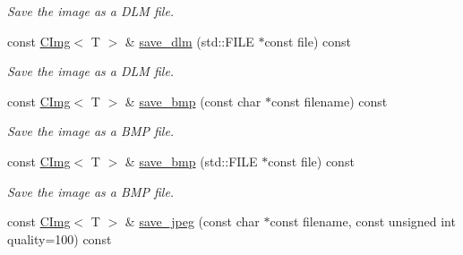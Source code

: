 \begin{DoxyCompactItemize}
\begin{DoxyCompactList}\small\item\em Save the image as a DLM file. \item\end{DoxyCompactList}\item 
\hypertarget{structcimg__library_1_1CImg_ad885e6c12443f07db548367d83668f62}{
const \hyperlink{structcimg__library_1_1CImg}{CImg}$<$ T $>$ \& \hyperlink{structcimg__library_1_1CImg_ad885e6c12443f07db548367d83668f62}{save\_\-dlm} (std::FILE $\ast$const file) const }
\label{structcimg__library_1_1CImg_ad885e6c12443f07db548367d83668f62}

\begin{DoxyCompactList}\small\item\em Save the image as a DLM file. \item\end{DoxyCompactList}\item 
\hypertarget{structcimg__library_1_1CImg_a2f8e01d96cddfa3c0d0d2dc9d86745ac}{
const \hyperlink{structcimg__library_1_1CImg}{CImg}$<$ T $>$ \& \hyperlink{structcimg__library_1_1CImg_a2f8e01d96cddfa3c0d0d2dc9d86745ac}{save\_\-bmp} (const char $\ast$const filename) const }
\label{structcimg__library_1_1CImg_a2f8e01d96cddfa3c0d0d2dc9d86745ac}

\begin{DoxyCompactList}\small\item\em Save the image as a BMP file. \item\end{DoxyCompactList}\item 
\hypertarget{structcimg__library_1_1CImg_acb4b655a3aca162d8db9257f989f765e}{
const \hyperlink{structcimg__library_1_1CImg}{CImg}$<$ T $>$ \& \hyperlink{structcimg__library_1_1CImg_acb4b655a3aca162d8db9257f989f765e}{save\_\-bmp} (std::FILE $\ast$const file) const }
\label{structcimg__library_1_1CImg_acb4b655a3aca162d8db9257f989f765e}

\begin{DoxyCompactList}\small\item\em Save the image as a BMP file. \item\end{DoxyCompactList}\item 
\hypertarget{structcimg__library_1_1CImg_a26ff26d1b1ce8dd8b221d13cc50434e2}{
const \hyperlink{structcimg__library_1_1CImg}{CImg}$<$ T $>$ \& \hyperlink{structcimg__library_1_1CImg_a26ff26d1b1ce8dd8b221d13cc50434e2}{save\_\-jpeg} (const char $\ast$const filename, const unsigned int quality=100) const }
\label{structcimg__library_1_1CImg_a26ff26d1b1ce8dd8b221d13cc50434e2}


\end{DoxyCompactItemize}
